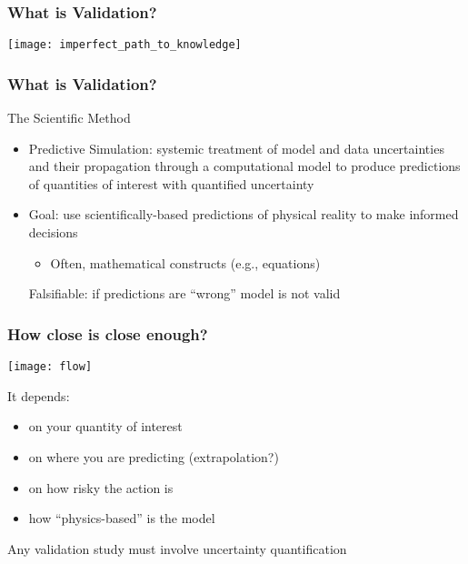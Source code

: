 \documentclass[mathserif]{beamer}
\begin{document}
\begin{frame}
 \frametitle{What is Validation?}

 \centering
  \texttt{[image: imperfect\_path\_to\_knowledge]}\\


\end{frame}
%
%
%
\begin{frame}
 \frametitle{What is Validation?}

 \begin{block}{The Scientific Method}
  \begin{itemize}
  \item Predictive Simulation: systemic treatment of model and data uncertainties and their
    propagation through a computational model to produce predictions
    of quantities of interest with quantified uncertainty
  \item Goal: use scientifically-based predictions of physical reality to make informed decisions
    \begin{itemize}
    \item Often, mathematical constructs (e.g., equations)
    \end{itemize}
    Falsifiable: if predictions are ``wrong'' model is not valid
  \end{itemize}
 \end{block}

\end{frame}
%
%
%
\begin{frame}
\frametitle{How close is close enough?}

 \centering
  \texttt{[image: flow]}\\

\begin{block}{It depends:}
  \begin{itemize}
   \item on your quantity of interest
   \item on where you are predicting (extrapolation?)
   \item on how risky the action is
   \item how ``physics-based'' is the model
  \end{itemize}
\end{block}

\centering
Any validation study must involve uncertainty quantification

\end{frame}
\end{document}

